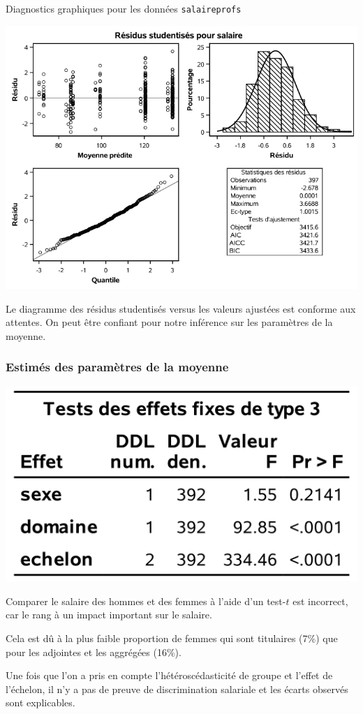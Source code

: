 \documentclass{beamer}
\begin{document}
\begin{frame}{Diagnostics graphiques pour les données \texttt{salaireprofs}}
  \begin{center}
\includegraphics[width = 0.7\linewidth]{img/c5/diapos6-e28}  
 \end{center}
 Le diagramme des résidus studentisés versus les valeurs ajustées est conforme aux attentes. On peut être confiant pour notre inférence sur les paramètres de la moyenne.
\end{frame}
\begin{frame}
 \frametitle{Estimés des paramètres de la moyenne}
 \begin{center}
  \includegraphics[width = 0.45\linewidth]{img/c5/diapos6-e27}  
 \end{center}

 \bi \item 
 Comparer le salaire des hommes et des femmes à l'aide d'un test-$t$ est incorrect, car le rang à un impact important sur le salaire.
 \item  Cela est dû à la plus faible proportion de femmes qui sont titulaires (7\%) que pour les adjointes et les aggrégées (16\%).
 \item Une fois que l'on a pris en compte l'hétéroscédasticité de groupe et l'effet de l'échelon, il n'y a pas de preuve de discrimination salariale et les écarts observés sont explicables.
 \ei
\end{frame}
\end{document}
